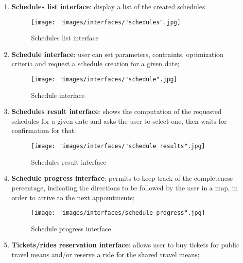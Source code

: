 \begin{enumerate}
\item \textbf{Schedules list interface}: display a list of the created schedules
\begin{figure}[H]
\begin{center}
\texttt{[image: "images/interfaces/"schedules".jpg]}
\caption{Schedules list interface}
\end{center}
\end{figure}

\item \textbf{Schedule interface}: user can set parameters, contraints, optimization criteria and request a schedule creation for a given date;
\begin{figure}[H]
\begin{center}
\texttt{[image: "images/interfaces/"schedule".jpg]}
\caption{Schedule interface}
\end{center}
\end{figure}

\item \textbf{Schedules result interface}: shows the computation of the requested schedules for a given date and asks the user to select one, then waits for confirmation for that;
\begin{figure}[H]
\begin{center}
\texttt{[image: "images/interfaces/"schedule results".jpg]}
\caption{Schedules result interface}
\end{center}
\end{figure}

\item \textbf{Schedule progress interface}: permits to keep track of the completeness percentage, indicating the directions to be followed by the user in a map, in order to arrive to the next appointments;
\begin{figure}[H]
\begin{center}
\texttt{[image: "images/interfaces/schedule progress".jpg]}
\caption{Schedule progress interface}
\end{center}
\end{figure}

\item \textbf{Tickets/rides reservation interface}: allows user to buy tickets for public travel means and/or reserve a ride for the shared travel means;
\end{enumerate}

